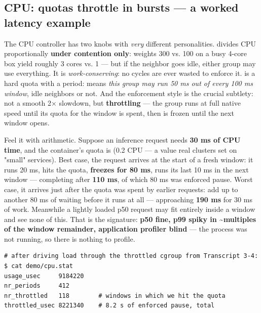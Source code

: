 \subsection*{CPU: quotas throttle in bursts — a worked latency example}

The CPU controller has two knobs with \textit{very} different personalities.  divides CPU proportionally \textbf{under contention only}: weights 300 vs. 100 on a busy 4-core box yield roughly 3 cores vs. 1 — but if the neighbor goes idle, either group may use everything. It is \textit{work-conserving}: no cycles are ever wasted to enforce it.  is a hard quota with a period:  means \textit{this group may run 50 ms out of every 100 ms window}, idle neighbors or not. And the enforcement style is the crucial subtlety: not a smooth 2× slowdown, but \textbf{throttling} — the group runs at full native speed until its quota for the window is spent, then is frozen until the next window opens.

Feel it with arithmetic. Suppose an inference request needs \textbf{30 ms of CPU time}, and the container's quota is  (0.2 CPU — a value real clusters set on "small" services). Best case, the request arrives at the start of a fresh window: it runs 20 ms, hits the quota, \textbf{freezes for 80 ms}, runs its last 10 ms in the next window — completing after \textbf{110 ms}, of which 80 ms was enforced pause. Worst case, it arrives just after the quota was spent by earlier requests: add up to another 80 ms of waiting before it runs at all — approaching \textbf{190 ms} for 30 ms of work. Meanwhile a lightly loaded p50 request may fit entirely inside a window and see none of this. That is the signature: \textbf{p50 fine, p99 spiky in \textasciitilde{}multiples of the window remainder, application profiler blind} — the process was not running, so there is nothing to profile.

\begin{terminalbox}
\begin{Verbatim}[breaklines=true,breakanywhere=true,fontsize=\small,formatcom=\color{tbbtermfg},codes=\tbbcodeactive]
# after driving load through the throttled cgroup from Transcript 3-4:
$ cat demo/cpu.stat
usage_usec     9184220
nr_periods     412
nr_throttled   118        # windows in which we hit the quota
throttled_usec 8221340    # 8.2 s of enforced pause, total
\end{Verbatim}
\end{terminalbox}

